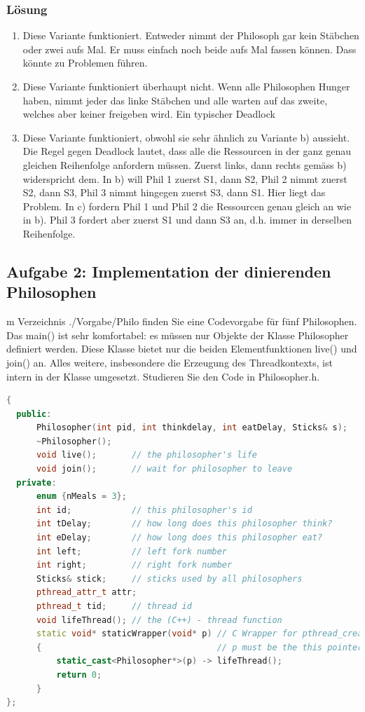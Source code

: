 \subsubsection{Lösung}

\begin{enumerate}
  \item Diese Variante funktioniert. Entweder nimmt der Philosoph gar kein Stäbchen oder zwei aufs Mal. Er
muss einfach noch beide aufs Mal fassen können. Dass könnte zu Problemen führen.
\item Diese Variante funktioniert überhaupt nicht. Wenn alle Philosophen Hunger haben, nimmt jeder das linke
Stäbchen und alle warten auf das zweite, welches aber keiner freigeben wird. Ein typischer Deadlock
\item Diese Variante funktioniert, obwohl sie sehr ähnlich zu Variante b) aussieht. Die Regel gegen Deadlock
lautet, dass alle die Ressourcen in der ganz genau gleichen Reihenfolge anfordern müssen.
Zuerst links, dann rechts gemäss b) widerspricht dem. In b) will Phil 1 zuerst S1, dann S2, Phil 2 nimmt
zuerst S2, dann S3, Phil 3 nimmt hingegen zuerst S3, dann S1. Hier liegt das Problem.
In c) fordern Phil 1 und Phil 2 die Ressourcen genau gleich an wie in b). Phil 3 fordert aber zuerst S1
und dann S3 an, d.h. immer in derselben Reihenfolge.
\end{enumerate}

\subsection{Aufgabe 2: Implementation der dinierenden Philosophen}

m Verzeichnis ./Vorgabe/Philo finden Sie eine Codevorgabe für fünf Philosophen. Das main() ist sehr
komfortabel: es müssen nur Objekte der Klasse Philosopher definiert werden. Diese Klasse bietet nur die
beiden Elementfunktionen live() und join() an. Alles weitere, insbesondere die Erzeugung des Threadkontexts,
ist intern in der Klasse umgesetzt.
Studieren Sie den Code in Philosopher.h.

\begin{lstlisting}[language=C++, style=C++]
{
  public:
      Philosopher(int pid, int thinkdelay, int eatDelay, Sticks& s);
      ~Philosopher();
      void live();       // the philosopher's life
      void join();       // wait for philosopher to leave
  private:
      enum {nMeals = 3};
      int id;            // this philosopher's id
      int tDelay;        // how long does this philosopher think?
      int eDelay;        // how long does this philosopher eat?
      int left;          // left fork number
      int right;         // right fork number
      Sticks& stick;     // sticks used by all philosophers
      pthread_attr_t attr;
      pthread_t tid;     // thread id
      void lifeThread(); // the (C++) - thread function
      static void* staticWrapper(void* p) // C Wrapper for pthread_create()
      {                                   // p must be the this pointer
          static_cast<Philosopher*>(p) -> lifeThread();
          return 0;
      }
};
\end{lstlisting}

